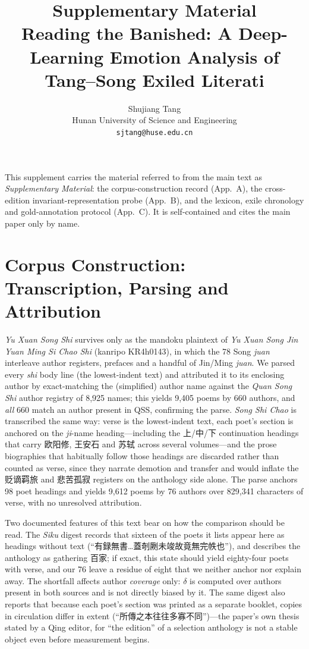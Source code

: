 \documentclass[11pt]{article}
\title{Supplementary Material\\[0.4em]
\large Reading the Banished: A Deep-Learning Emotion Analysis of
Tang--Song Exiled Literati}
\author{Shujiang Tang\\
Hunan University of Science and Engineering\\
\texttt{sjtang@huse.edu.cn}}
\date{}
\begin{document}
\maketitle

\noindent This supplement carries the material referred to from the main text as
\emph{Supplementary Material}: the corpus-construction record (App.~A), the
cross-edition invariant-representation probe (App.~B), and the lexicon, exile
chronology and gold-annotation protocol (App.~C). It is self-contained and cites the
main paper only by name.

\section{Corpus Construction: Transcription, Parsing and Attribution}
\label{app:parse}
\emph{Yu Xuan Song Shi} survives only as the mandoku plaintext of \emph{Yu Xuan Song
Jin Yuan Ming Si Chao Shi} (kanripo KR4h0143), in which the 78 Song \emph{juan}
interleave author registers, prefaces and a handful of Jin/Ming \emph{juan}. We
parsed every \emph{shi} body line (the lowest-indent text) and attributed it to its
enclosing author by exact-matching the (simplified) author name against the
\emph{Quan Song Shi} author registry of 8{,}925 names; this yields 9{,}405 poems by
660 authors, and \emph{all} 660 match an author present in QSS, confirming the
parse. \emph{Song Shi Chao} is transcribed the same way: verse is the lowest-indent
text, each poet's section is anchored on the \emph{ji}-name heading---including the
上/中/下 continuation headings that carry 欧阳修, 王安石 and 苏轼 across several
volumes---and the prose biographies that habitually follow those headings are
discarded rather than counted as verse, since they narrate demotion and transfer and
would inflate the 贬谪羁旅 and 悲苦孤寂 registers on the anthology side alone. The
parse anchors 98 poet headings and yields 9{,}612 poems by 76 authors over 829{,}341
characters of verse, with no unresolved attribution.

Two documented features of this text bear on how the comparison should be read. The
\emph{Siku} digest records that sixteen of the poets it lists appear here as headings
without text (``有録無書\ldots 蓋剞劂未竣故竟無完帙也''), and describes the anthology
as gathering 百家; if exact, this state should yield eighty-four poets with verse,
and our 76 leave a residue of eight that we neither anchor nor explain away. The
shortfall affects author \emph{coverage} only: $\delta$ is computed over authors
present in both sources and is not directly biased by it. The same digest also reports
that because each poet's section was printed as a separate booklet, copies in
circulation differ in extent (``所傳之本往往多寡不同'')---the paper's own thesis
stated by a Qing editor, for ``the edition'' of a selection anthology is not a stable
object even before measurement begins.
\end{document}
